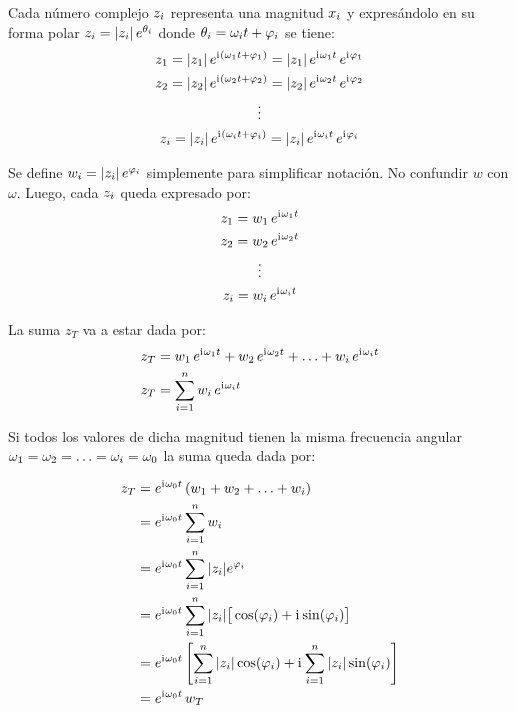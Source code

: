 \documentclass[a5paper,12pt,twoside]{book}
\begin{document}
Cada número complejo $z_i$ representa una magnitud $x_i$ y expresándolo en su forma polar $z_i={\left| {z_i} \right|}\,e^{\theta_i}$ donde $\theta_i=\omega_i t + \varphi_i$ se tiene:
\begin{gather*}
    z_1 = {\left| {z_1} \right|} \, e^{\mathrm{i}\mkern1mu (\omega_1 t + \varphi_1)} = {\left| {z_1} \right|} \, e^{\mathrm{i}\mkern1mu \omega_1 t} \, e^{\mathrm{i}\mkern1mu \varphi_1}
    \\
    z_2 = {\left| {z_2} \right|} \, e^{\mathrm{i}\mkern1mu (\omega_2 t + \varphi_2)} = {\left| {z_2} \right|} \, e^{\mathrm{i}\mkern1mu \omega_2 t} \, e^{\mathrm{i}\mkern1mu \varphi_2}
    \\
    \vdots
    \\
    z_i = {\left| {z_i} \right|} \, e^{\mathrm{i}\mkern1mu (\omega_i t + \varphi_i)} = {\left| {z_i} \right|} \, e^{\mathrm{i}\mkern1mu \omega_i t} \, e^{\mathrm{i}\mkern1mu \varphi_i}
\end{gather*}

Se define $w_i={\left| {z_i} \right|}\,e^{\varphi_i}$ simplemente para simplificar notación. No confundir $w$ con $\omega$. Luego, cada $z_i$ queda expresado por:
\begin{gather*}
    z_1 = w_1 \, e^{\mathrm{i}\mkern1mu \omega_1 t}
    \\
    z_2 = w_2 \, e^{\mathrm{i}\mkern1mu \omega_2 t}
    \\
    \vdots
    \\
    z_i = w_i \, e^{\mathrm{i}\mkern1mu \omega_i t}
\end{gather*}

La suma $z_T$ va a estar dada por:
\begin{align*}
    z_T &= w_1 \, e^{\mathrm{i}\mkern1mu \omega_1 t} + w_2 \, e^{\mathrm{i}\mkern1mu \omega_2 t} + \ldots + w_i \, e^{\mathrm{i}\mkern1mu \omega_i t}
    \\
    z_T &= \sum_{i=1}^n w_i \, e^{\mathrm{i}\mkern1mu \omega_i t}
\end{align*}

Si todos los valores de dicha magnitud tienen la misma frecuencia angular $\omega_1=\omega_2=\ldots=\omega_i=\omega_0$ la suma queda dada por:

\begin{align*}
    z_T &= e^{\mathrm{i}\mkern1mu \omega_0 t} \left( w_1 + w_2 + \ldots + w_i \right)
    \\
    &=  e^{\mathrm{i}\mkern1mu \omega_0 t} \sum_{i=1}^n w_i
    \\
    &= e^{\mathrm{i}\mkern1mu \omega_0 t} \sum_{i=1}^n {\left| {z_i} \right|} e^{\varphi_i}
    \\
    &= e^{\mathrm{i}\mkern1mu \omega_0 t} \sum_{i=1}^n {\left| {z_i} \right|} \big[ \cos(\varphi_i)+\mathrm{i}\mkern1mu\sin(\varphi_i) \big]
    \\
    &= e^{\mathrm{i}\mkern1mu \omega_0 t} \left[ \sum_{i=1}^n {\left| {z_i} \right|} \cos(\varphi_i) + \mathrm{i}\mkern1mu \sum_{i=1}^n {\left| {z_i} \right|} \sin(\varphi_i) \right]
    \\
    &= e^{\mathrm{i}\mkern1mu \omega_0 t} \, w_T
\end{align*}
\end{document}
